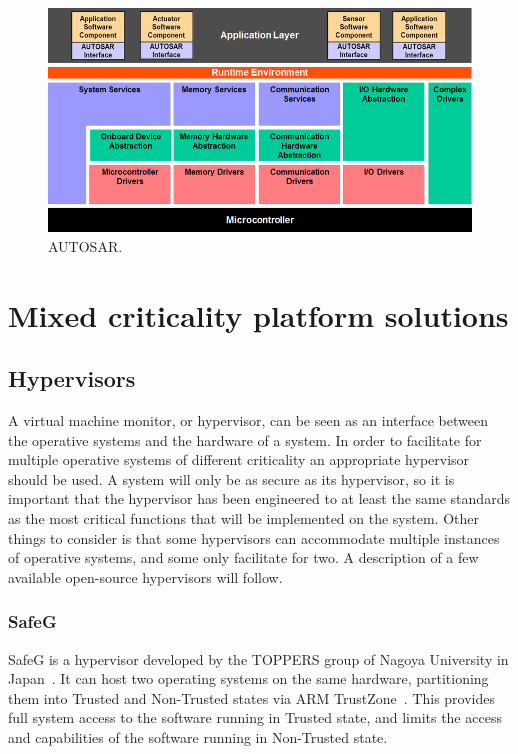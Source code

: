 \begin{figure}[H]
\centering
\includegraphics[width=\textwidth]{./img/literature_autosar.png}
\caption{AUTOSAR.~\cite{website:autosar}}\label{fig:autosar}
\end{figure}

\section{Mixed criticality platform solutions}

\subsection{Hypervisors}
A virtual machine monitor, or hypervisor, can be seen as an interface between the operative systems and the hardware of a system. In order to facilitate for multiple operative systems of different criticality an appropriate hypervisor should be used. A system will only be as secure as its hypervisor, so it is important that the hypervisor has been engineered to at least the same standards as the most critical functions that will be implemented on the system. Other things to consider is that some hypervisors can accommodate multiple instances of operative systems, and some only facilitate for two. A description of a few available open-source hypervisors will follow.

\subsubsection{SafeG}
SafeG is a hypervisor developed by the TOPPERS group of Nagoya University in Japan~\cite{website:safeg}. It can host two operating systems on the same hardware, partitioning them into Trusted and Non-Trusted states via ARM TrustZone~\cite{website:ARM}. This provides full system access to the software running in Trusted state, and limits the access and capabilities of the software running in Non-Trusted state.

